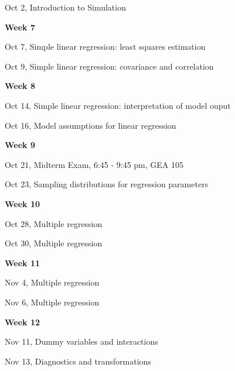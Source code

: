 \documentclass[11pt]{article}
\begin{document}
	Oct 2, %
	Introduction to Simulation
	
	
	
	
		
\vspace{2mm}\noindent\textbf{Week 7} 


{ Oct 7, Simple linear regression: least squares estimation}

Oct 9, Simple linear regression: covariance and correlation

%	

	
	
\vspace{2mm}\noindent\textbf{Week 8}

Oct 14, 
Simple linear regression: interpretation of model ouput

	
	Oct 16, Model assumptions for linear regression
	
	
\vspace{2mm}\noindent\textbf{Week 9}

{\color{UTAustin}
	Oct 21, Midterm Exam, 6:45 - 9:45 pm, GEA 105
}

	Oct 23, Sampling distributions for regression parameters
	
		
\vspace{2mm}\noindent\textbf{Week 10}

		
	Oct 28,  Multiple regression
	
	Oct 30, Multiple regression

\vspace{2mm}\noindent\textbf{Week 11}

	
	
	Nov 4,  Multiple regression %
	
	Nov 6, Multiple regression
	
\vspace{2mm}\noindent\textbf{Week 12} 

	
	{ Nov 11, Dummy variables and interactions } %
	
	Nov 13, Diagnostics and transformations %
	
\end{document}
